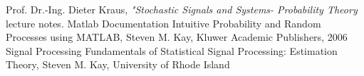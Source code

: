 \begin{thebibliography}{15}
 Prof. Dr.-Ing. Dieter Kraus,\textit{ "Stochastic Signals and Systems- Probability Theory} lecture notes.
 Matlab Documentation
 Intuitive Probability and Random Processes using MATLAB, Steven M. Kay, Kluwer Academic Publishers, 2006
 Signal Processing Fundamentals of Statistical Signal Processing: Estimation Theory, Steven M. Kay, University of Rhode Island

\end{thebibliography}